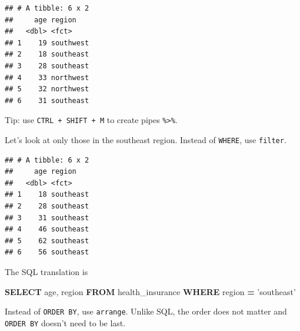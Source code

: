 \documentclass[openany]{book}
\newenvironment{Shaded}{\begin{snugshade}}{\end{snugshade}}
\newcommand{\KeywordTok}[1]{\textcolor[rgb]{0.13,0.29,0.53}{\textbf{#1}}}
\newcommand{\NormalTok}[1]{#1}
\newcommand{\OperatorTok}[1]{\textcolor[rgb]{0.81,0.36,0.00}{\textbf{#1}}}
\newcommand{\StringTok}[1]{\textcolor[rgb]{0.31,0.60,0.02}{#1}}
\begin{document}
\begin{Shaded}
\end{Shaded}

\begin{verbatim}
## # A tibble: 6 x 2
##     age region   
##   <dbl> <fct>    
## 1    19 southwest
## 2    18 southeast
## 3    28 southeast
## 4    33 northwest
## 5    32 northwest
## 6    31 southeast
\end{verbatim}

Tip: use \texttt{CTRL\ +\ SHIFT\ +\ M} to create pipes \texttt{\%\textgreater{}\%}.

Let's look at only those in the southeast region. Instead of \texttt{WHERE}, use \texttt{filter}.

\begin{Shaded}
\end{Shaded}

\begin{verbatim}
## # A tibble: 6 x 2
##     age region   
##   <dbl> <fct>    
## 1    18 southeast
## 2    28 southeast
## 3    31 southeast
## 4    46 southeast
## 5    62 southeast
## 6    56 southeast
\end{verbatim}

The SQL translation is

\begin{Shaded}
\begin{Highlighting}[]
\KeywordTok{SELECT}\NormalTok{ age, region}
\KeywordTok{FROM}\NormalTok{ health_insurance}
\KeywordTok{WHERE}\NormalTok{ region }\OperatorTok{=} \StringTok{'southeast'}
\end{Highlighting}
\end{Shaded}

Instead of \texttt{ORDER\ BY}, use \texttt{arrange}. Unlike SQL, the order does not matter and \texttt{ORDER\ BY} doesn't need to be last.
\end{document}
